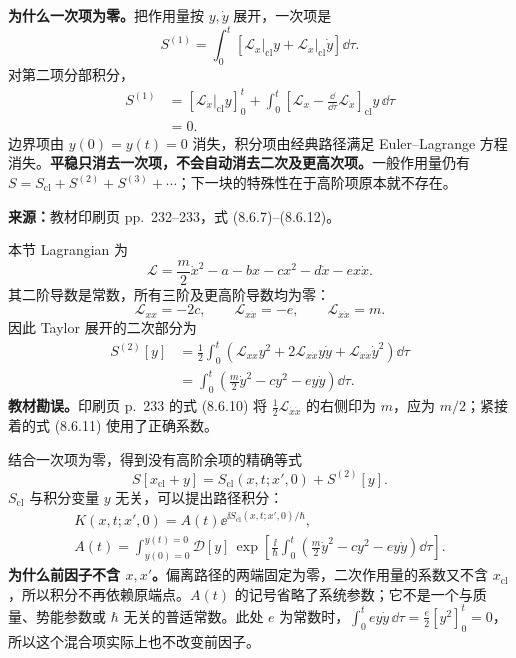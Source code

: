 \textbf{为什么一次项为零。}把作用量按 $y,\dot y$ 展开，一次项是
\begin{equation}
  S^{(1)}=\int_0^t
  \left[\left.\mathcal L_x\right|_{\mathrm{cl}}y
  +\left.\mathcal L_{\dot x}\right|_{\mathrm{cl}}\dot y\right]\dd\tau.
\end{equation}
对第二项分部积分，
\begin{align}
  S^{(1)}
  &=\left[\left.\mathcal L_{\dot x}\right|_{\mathrm{cl}}y\right]_0^t
    +\int_0^t\left[\mathcal L_x
      -\frac{\dd}{\dd\tau}\mathcal L_{\dot x}\right]_{\mathrm{cl}}y\,\dd\tau\\
  &=0.
\end{align}
边界项由 $y(0)=y(t)=0$ 消失，积分项由经典路径满足 Euler--Lagrange 方程消失。\textbf{平稳只消去一次项，不会自动消去二次及更高次项。}一般作用量仍有 $S=S_{\mathrm{cl}}+S^{(2)}+S^{(3)}+\cdots$；下一块的特殊性在于高阶项原本就不存在。

\textbf{来源：}教材印刷页 pp.~232--233，式 (8.6.7)--(8.6.12)。

本节 Lagrangian 为
\begin{equation}
  \mathcal L=\frac m2\dot x^2-a-bx-cx^2-d\dot x-ex\dot x.
\end{equation}
其二阶导数是常数，所有三阶及更高阶导数均为零：
\begin{equation}
  \mathcal L_{xx}=-2c,\qquad
  \mathcal L_{x\dot x}=-e,\qquad
  \mathcal L_{\dot x\dot x}=m.
\end{equation}
因此 Taylor 展开的二次部分为
\begin{align}
  S^{(2)}[y]
  &=\frac12\int_0^t
    \left(\mathcal L_{xx}y^2+2\mathcal L_{x\dot x}y\dot y
      +\mathcal L_{\dot x\dot x}\dot y^2\right)\dd\tau\\
  &=\int_0^t\left(\frac m2\dot y^2-cy^2-ey\dot y\right)\dd\tau.
\end{align}
\textbf{教材勘误。}印刷页 p.~233 的式 (8.6.10) 将 $\frac12\mathcal L_{\dot x\dot x}$ 的右侧印为 $m$，应为 $m/2$；紧接着的式 (8.6.11) 使用了正确系数。

结合一次项为零，得到没有高阶余项的精确等式
\begin{equation}
  \boxed{S[x_{\mathrm{cl}}+y]
    =S_{\mathrm{cl}}(x,t;x',0)+S^{(2)}[y]}.
  \label{eq:QM-C08-S06-action-split}
\end{equation}
$S_{\mathrm{cl}}$ 与积分变量 $y$ 无关，可以提出路径积分：
\begin{align}
  \boxed{K(x,t;x',0)=A(t)\ee^{\ii S_{\mathrm{cl}}(x,t;x',0)/\hbar}},
  \label{eq:QM-C08-S06-factorization}\\
  A(t)=\int_{y(0)=0}^{y(t)=0}\mathcal D[y]\,
  \exp\!\left[\frac{\ii}{\hbar}\int_0^t
    \left(\frac m2\dot y^2-cy^2-ey\dot y\right)\dd\tau\right].
  \label{eq:QM-C08-S06-prefactor}
\end{align}
\textbf{为什么前因子不含 $x,x'$。}偏离路径的两端固定为零，二次作用量的系数又不含 $x_{\mathrm{cl}}$，所以积分不再依赖原端点。$A(t)$ 的记号省略了系统参数；它不是一个与质量、势能参数或 $\hbar$ 无关的普适常数。此处 $e$ 为常数时，$\int_0^t ey\dot y\,\dd\tau=\frac e2[y^2]_0^t=0$，所以这个混合项实际上也不改变前因子。

